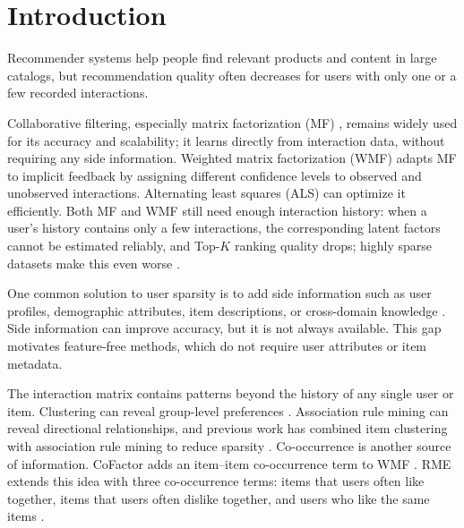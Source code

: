 \documentclass[pdflatex,sn-vancouver-num]{sn-jnl}%
\theoremstyle{thmstyleone}%
\theoremstyle{thmstyletwo}%
\theoremstyle{thmstylethree}%
\begin{document}



\maketitle



\section{Introduction}\label{sec1}

Recommender systems help people find relevant products and content in large catalogs, but recommendation quality often decreases for users with only one or a few recorded interactions.

Collaborative filtering, especially matrix factorization (MF) \cite{koren2009mf}, remains widely used for its accuracy and scalability; it learns directly from interaction data, without requiring any side information. Weighted matrix factorization (WMF) \cite{hu2008implicit} adapts MF to implicit feedback by assigning different confidence levels to observed and unobserved interactions. Alternating least squares (ALS) can optimize it efficiently. Both MF and WMF still need enough interaction history: when a user's history contains only a few interactions, the corresponding latent factors cannot be estimated reliably, and Top-$K$ ranking quality drops; highly sparse datasets make this even worse \cite{roy2022systematic}.

One common solution to user sparsity is to add side information such as user profiles, demographic attributes, item descriptions, or cross-domain knowledge \cite{nguyen2013contentBoostedMF,fernandezTobias2019crossDomainColdStart,parthasarathy2023hybrid}. Side information can improve accuracy, but it is not always available. This gap motivates feature-free methods, which do not require user attributes or item metadata.

The interaction matrix contains patterns beyond the history of any single user or item. Clustering can reveal group-level preferences \cite{mirbakhsh2016leveraging}. Association rule mining can reveal directional relationships, and previous work has combined item clustering with association rule mining to reduce sparsity \cite{najafabadi2017clusteringARM}. Co-occurrence is another source of information. CoFactor adds an item--item co-occurrence term to WMF \cite{liang2016cofactor}. RME extends this idea with three co-occurrence terms: items that users often like together, items that users often dislike together, and users who like the same items \cite{tran2018rme}.
\end{document}
